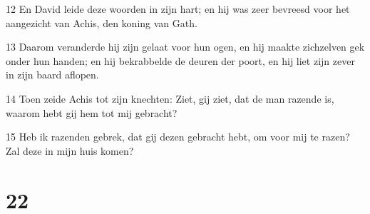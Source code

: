 \par 12 En David leide deze woorden in zijn hart; en hij was zeer bevreesd voor het aangezicht van Achis, den koning van Gath.
\par 13 Daarom veranderde hij zijn gelaat voor hun ogen, en hij maakte zichzelven gek onder hun handen; en hij bekrabbelde de deuren der poort, en hij liet zijn zever in zijn baard aflopen.
\par 14 Toen zeide Achis tot zijn knechten: Ziet, gij ziet, dat de man razende is, waarom hebt gij hem tot mij gebracht?
\par 15 Heb ik razenden gebrek, dat gij dezen gebracht hebt, om voor mij te razen? Zal deze in mijn huis komen?

\chapter{22}

